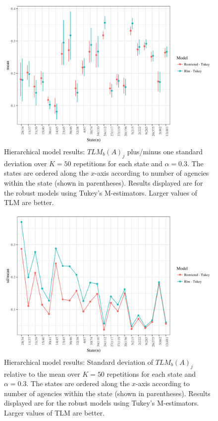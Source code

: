 \documentclass[ba]{imsart}
\begin{document}
 
\begin{figure}[t]
\includegraphics[width=7in]{hier_ave_tlm_state.png}
\caption{Hierarchical model results: ${TLM}_b(A)_{j}$  plus/minus one standard deviation over $K = 50$ repetitions for each state and $\alpha = 0.3$. The states are ordered along the $x$-axis according to number of agencies within the state (shown in parentheses). Results displayed are for the robust models using Tukey's M-estimators. Larger values of TLM are better.}
\label{fig:hierTLMstate}
\end{figure}

\begin{figure}[t]
\includegraphics[width=7in]{hier_sd_tlm_state.png}
\caption{Hierarchical model results: Standard deviation of ${TLM}_b(A)_{j}$  relative to the mean over $K = 50$ repetitions for each state and $\alpha = 0.3$. The states are ordered along the $x$-axis according to number of agencies within the state (shown in parentheses). Results displayed are for the robust models using Tukey's M-estimators. Larger values of TLM are better.}
\label{fig:hierTLMstateSD}
\end{figure}
\end{document}
